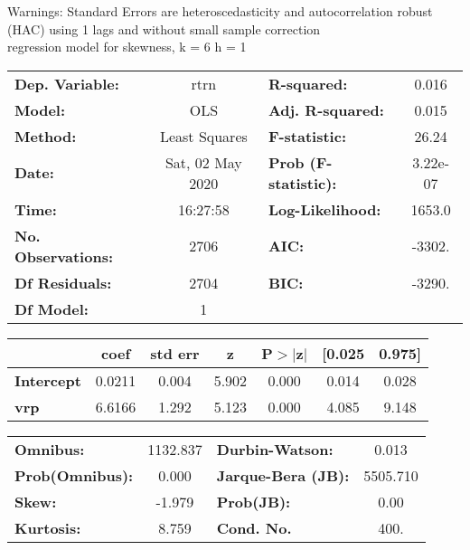 Warnings: \newline
 [1] Standard Errors are heteroscedasticity and autocorrelation robust (HAC) using 1 lags and without small sample correction\\ 

regression model for skewness, k = 6 h = 1\begin{center}
\begin{tabular}{lclc}
\toprule
\textbf{Dep. Variable:}    &       rtrn       & \textbf{  R-squared:         } &     0.016   \\
\textbf{Model:}            &       OLS        & \textbf{  Adj. R-squared:    } &     0.015   \\
\textbf{Method:}           &  Least Squares   & \textbf{  F-statistic:       } &     26.24   \\
\textbf{Date:}             & Sat, 02 May 2020 & \textbf{  Prob (F-statistic):} &  3.22e-07   \\
\textbf{Time:}             &     16:27:58     & \textbf{  Log-Likelihood:    } &    1653.0   \\
\textbf{No. Observations:} &        2706      & \textbf{  AIC:               } &    -3302.   \\
\textbf{Df Residuals:}     &        2704      & \textbf{  BIC:               } &    -3290.   \\
\textbf{Df Model:}         &           1      & \textbf{                     } &             \\
\bottomrule
\end{tabular}
\begin{tabular}{lcccccc}
                   & \textbf{coef} & \textbf{std err} & \textbf{z} & \textbf{P$> |$z$|$} & \textbf{[0.025} & \textbf{0.975]}  \\
\midrule
\textbf{Intercept} &       0.0211  &        0.004     &     5.902  &         0.000        &        0.014    &        0.028     \\
\textbf{vrp}       &       6.6166  &        1.292     &     5.123  &         0.000        &        4.085    &        9.148     \\
\bottomrule
\end{tabular}
\begin{tabular}{lclc}
\textbf{Omnibus:}       & 1132.837 & \textbf{  Durbin-Watson:     } &    0.013  \\
\textbf{Prob(Omnibus):} &   0.000  & \textbf{  Jarque-Bera (JB):  } & 5505.710  \\
\textbf{Skew:}          &  -1.979  & \textbf{  Prob(JB):          } &     0.00  \\
\textbf{Kurtosis:}      &   8.759  & \textbf{  Cond. No.          } &     400.  \\
\bottomrule
\end{tabular}
\end{center}


